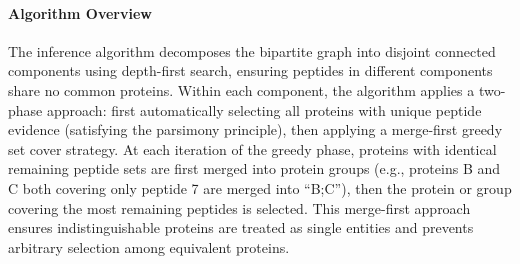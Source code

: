 \documentclass{article}
\begin{document}
\paragraph{Algorithm Overview} The inference algorithm decomposes the bipartite graph into disjoint connected components using depth-first search, ensuring peptides in different components share no common proteins. Within each component, the algorithm applies a two-phase approach: first automatically selecting all proteins with unique peptide evidence (satisfying the parsimony principle), then applying a merge-first greedy set cover strategy. At each iteration of the greedy phase, proteins with identical remaining peptide sets are first merged into protein groups (e.g., proteins B and C both covering only peptide 7 are merged into ``B;C''), then the protein or group covering the most remaining peptides is selected. This merge-first approach ensures indistinguishable proteins are treated as single entities and prevents arbitrary selection among equivalent proteins.
\end{document}
